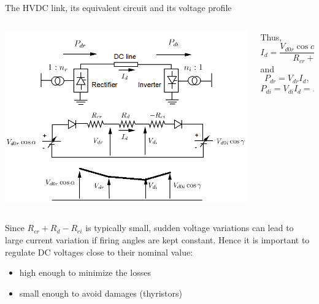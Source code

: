 \begin{frame}[allowframebreaks]{The HVDC link, its equivalent circuit and its voltage profile}


\begin{columns}
\begin{column}{0.6\linewidth}
\begin{center}
    \includegraphics[width=\linewidth]{images/HVDC-equiv.png}
\end{center}
\end{column}
\begin{column}{0.4\linewidth}
Thus,
$$I_d=\frac{V_{d0r}\cos \alpha - V_{d0i} \cos \gamma}{R_{cr} + R_d - R_{ci}}$$
and
$$P_{dr} = V_{dr}I_d,$$ $$P_{di} = V_{di}I_d = P_{dr} - R_d I_d^2$$
\end{column}
\end{columns}

Since $R_{cr} + R_d - R_{ci}$ is typically small, sudden voltage variations can lead to large current variation if firing angles are kept constant.
Hence it is important to regulate DC voltages close to their nominal value: 
\begin{itemize}
    \item high enough to minimize the losses
    \item small enough to avoid damages (thyristors)
\end{itemize}
\end{frame}

